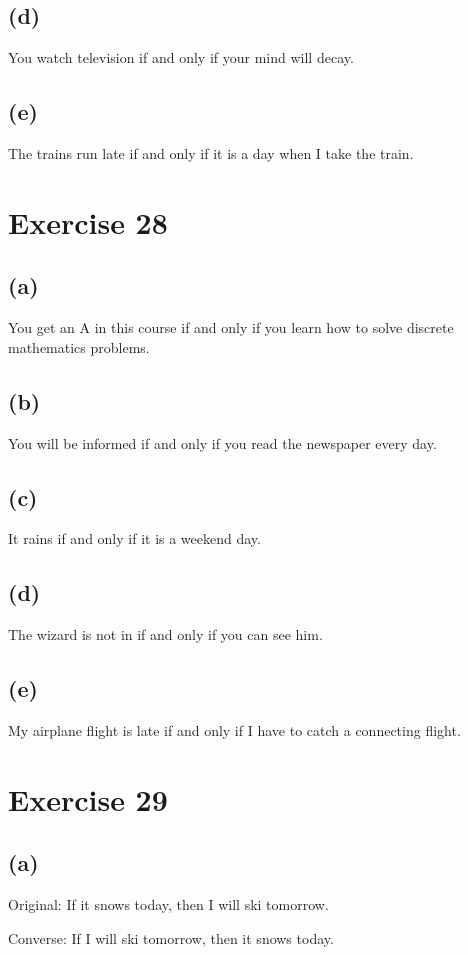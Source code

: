 \documentclass{article}
\begin{document}
\subsection{(d)}
You watch television if and only if your mind will decay.
\subsection{(e)}
The trains run late if and only if it is a day when I take the train.

\pagebreak

\section{Exercise 28}
\subsection{(a)}
You get an A in this course if and only if you learn how to solve discrete mathematics problems.
\subsection{(b)}
You will be informed if and only if you read the newspaper every day.
\subsection{(c)}
It rains if and only if it is a weekend day.
\subsection{(d)}
The wizard is not in if and only if you can see him.
\subsection{(e)}
My airplane flight is late if and only if I have to catch a connecting flight.

\pagebreak

\section{Exercise 29}
\subsection{(a)}
Original: If it snows today, then I will ski tomorrow.

Converse: If I will ski tomorrow, then it snows today.
\end{document}
